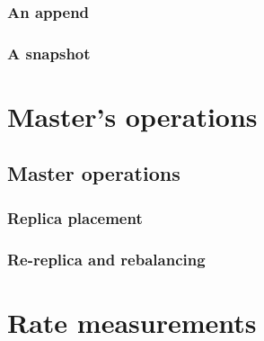 \documentclass{beamer}
\begin{document}
\begin{frame}
 \frametitle{An append}
 
\end{frame}

\begin{frame}
 \frametitle{A snapshot}
 
\end{frame}

\section{Master's operations}
\subsection{Master operations}
\begin{frame}
 \frametitle{Replica placement}
 
\end{frame}

\begin{frame}
 \frametitle{Re-replica and rebalancing}
 
\end{frame}

\section{Rate measurements}
\end{document}
